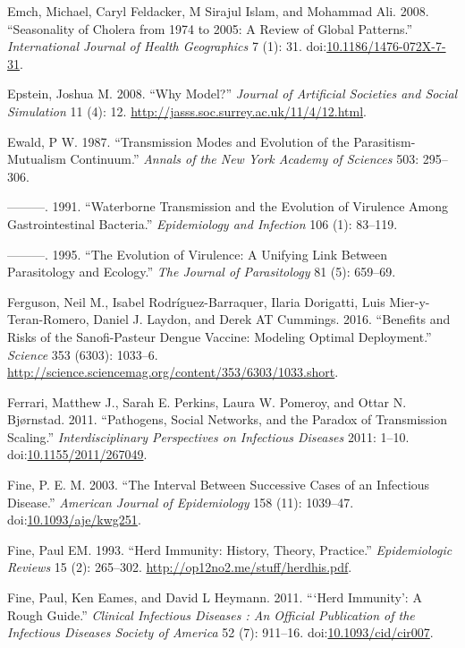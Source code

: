 \documentclass[]{book}
\theoremstyle{definition}
\theoremstyle{definition}
\theoremstyle{definition}
\theoremstyle{remark}
\begin{document}
\hypertarget{ref-emch08}{}
Emch, Michael, Caryl Feldacker, M Sirajul Islam, and Mohammad Ali. 2008.
``Seasonality of Cholera from 1974 to 2005: A Review of Global
Patterns.'' \emph{International Journal of Health Geographics} 7 (1):
31.
doi:\href{https://doi.org/10.1186/1476-072X-7-31}{10.1186/1476-072X-7-31}.

\hypertarget{ref-epstein08}{}
Epstein, Joshua M. 2008. ``Why Model?'' \emph{Journal of Artificial
Societies and Social Simulation} 11 (4): 12.
\url{http://jasss.soc.surrey.ac.uk/11/4/12.html}.

\hypertarget{ref-ewald87}{}
Ewald, P W. 1987. ``Transmission Modes and Evolution of the
Parasitism-Mutualism Continuum.'' \emph{Annals of the New York Academy
of Sciences} 503: 295--306.

\hypertarget{ref-ewald91}{}
---------. 1991. ``Waterborne Transmission and the Evolution of
Virulence Among Gastrointestinal Bacteria.'' \emph{Epidemiology and
Infection} 106 (1): 83--119.

\hypertarget{ref-ewald95}{}
---------. 1995. ``The Evolution of Virulence: A Unifying Link Between
Parasitology and Ecology.'' \emph{The Journal of Parasitology} 81 (5):
659--69.

\hypertarget{ref-ferguson16}{}
Ferguson, Neil M., Isabel Rodríguez-Barraquer, Ilaria Dorigatti, Luis
Mier-y-Teran-Romero, Daniel J. Laydon, and Derek AT Cummings. 2016.
``Benefits and Risks of the Sanofi-Pasteur Dengue Vaccine: Modeling
Optimal Deployment.'' \emph{Science} 353 (6303): 1033--6.
\url{http://science.sciencemag.org/content/353/6303/1033.short}.

\hypertarget{ref-ferrari11}{}
Ferrari, Matthew J., Sarah E. Perkins, Laura W. Pomeroy, and Ottar N.
Bjørnstad. 2011. ``Pathogens, Social Networks, and the Paradox of
Transmission Scaling.'' \emph{Interdisciplinary Perspectives on
Infectious Diseases} 2011: 1--10.
doi:\href{https://doi.org/10.1155/2011/267049}{10.1155/2011/267049}.

\hypertarget{ref-fine03}{}
Fine, P. E. M. 2003. ``The Interval Between Successive Cases of an
Infectious Disease.'' \emph{American Journal of Epidemiology} 158 (11):
1039--47.
doi:\href{https://doi.org/10.1093/aje/kwg251}{10.1093/aje/kwg251}.

\hypertarget{ref-fine93}{}
Fine, Paul EM. 1993. ``Herd Immunity: History, Theory, Practice.''
\emph{Epidemiologic Reviews} 15 (2): 265--302.
\url{http://op12no2.me/stuff/herdhis.pdf}.

\hypertarget{ref-fine11}{}
Fine, Paul, Ken Eames, and David L Heymann. 2011. ```Herd Immunity': A
Rough Guide.'' \emph{Clinical Infectious Diseases : An Official
Publication of the Infectious Diseases Society of America} 52 (7):
911--16.
doi:\href{https://doi.org/10.1093/cid/cir007}{10.1093/cid/cir007}.
\end{document}
